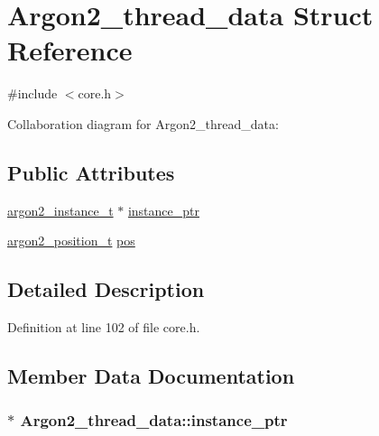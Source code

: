 \hypertarget{struct_argon2__thread__data}{}\section{Argon2\+\_\+thread\+\_\+data Struct Reference}
\label{struct_argon2__thread__data}


{\ttfamily \#include $<$core.\+h$>$}



Collaboration diagram for Argon2\+\_\+thread\+\_\+data\+:
\subsection*{Public Attributes}
\begin{DoxyCompactItemize}
\item 
\hyperlink{core_8h_ac888abc6f5f9faa538ff23dc92b1e1c2}{argon2\+\_\+instance\+\_\+t} $\ast$ \hyperlink{struct_argon2__thread__data_a54d0463f4eb4d9808383c29bfb5704cf}{instance\+\_\+ptr}
\item 
\hyperlink{core_8h_a24aa65731593323bf283524ded8b6cdb}{argon2\+\_\+position\+\_\+t} \hyperlink{struct_argon2__thread__data_a4f4c0a70218ac7ac50497b0abb33d439}{pos}
\end{DoxyCompactItemize}


\subsection{Detailed Description}


Definition at line 102 of file core.\+h.



\subsection{Member Data Documentation}
\hypertarget{struct_argon2__thread__data_a54d0463f4eb4d9808383c29bfb5704cf}{}
\subsubsection[{instance\+\_\+ptr}]{$\ast$ Argon2\+\_\+thread\+\_\+data\+::instance\+\_\+ptr}\label{struct_argon2__thread__data_a54d0463f4eb4d9808383c29bfb5704cf}


